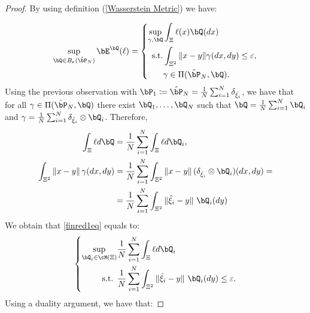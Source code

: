 \documentclass[11pt,a4paper,oneside,openany]{book}
\numberwithin{definition}{section}
\numberwithin{theorem}{section}
\numberwithin{problem}{section}
\begin{document}
\begin{proof}
    By using definition (\ref{Wasserstein Metric}) we have:
    
    \begin{equation}
    \label{finred1eq}
       \sup_{\bQ \in B_{\varepsilon}(\hat \bP_N)}\bE^{\bQ}(\ell) = \left\{
        \begin{aligned}
        \sup_{\gamma,\bQ} & \int_{\Xi}\ell (x) \bQ(dx) \\
        \text{s.t.} & \int_{\Xi^2}\|x-y\|\gamma(dx,dy) \leq \varepsilon, \\
        & \gamma \in \Pi(\hat \bP_N,\bQ).
        \end{aligned}
        \right.
    \end{equation}
    Using the previous observation with $\bP_1 \coloneqq \hat \bP_N =  \frac{1}{N}\sum_{i=1}^N \delta_{\hat \xi_i}$, we have that for all $\gamma \in \Pi(\hat \bP_N,\bQ)$ there exist $\bQ_1,\ldots,\bQ_N$ such that $\bQ = \frac{1}{N}\sum_{i=1}^N \bQ_i$ and $\gamma = \frac{1}{N}\sum_{i=1}^N \delta_{\hat \xi_i}\otimes \bQ_i$. Therefore, 
\begin{align*}
\int_{\Xi}\ell d\bQ &= \frac{1}{N}\sum_{i=1}^N \int_{\Xi}\ell d\bQ_i, \\
\int_{\Xi^2}\|x-y\|\, \gamma(dx,dy) &= \frac{1}{N}\sum_{i=1}^N \int_{\Xi^2}\|x-y\|\, (\delta_{\hat \xi_i}\otimes \bQ_i)(dx, dy) = \\
& =  \frac{1}{N}\sum_{i=1}^N \int_{\Xi^2}\|\hat \xi_i-y\|\ \bQ_i(dy)
\end{align*}
We obtain that \eqref{finred1eq} equals to:
\begin{equation}
    \left\{\begin{aligned}
        \sup_{\bQ_i \in \cM(\Xi)} & \frac{1}{N}\sum_{i=1}^N \int_{\Xi}\ell d\bQ_i \\
        \text{s.t. } & \frac{1}{N}\sum_{i=1}^N \int_{\Xi^2}\|\hat \xi_i-y\|\ \bQ_i(dy) \leq \varepsilon. \\
    \end{aligned}
    \right. 
\end{equation}
Using a  duality argument, we have that:



\end{proof}
\end{document}
